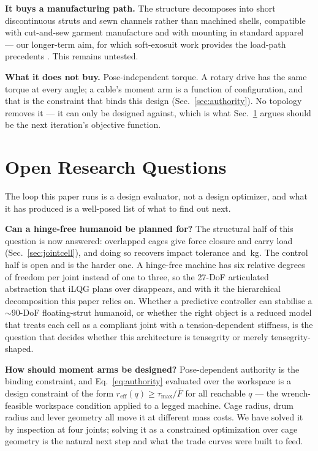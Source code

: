 \documentclass[conference]{IEEEtran}
\newcommand{\Fmax}{\bar{F}}
\begin{document}
\textbf{It buys a manufacturing path.} The structure decomposes into short
discontinuous struts and sewn channels rather than machined shells, compatible
with cut-and-sew garment manufacture and with mounting in standard apparel ---
our longer-term aim, for which soft-exosuit work provides the load-path
precedents \cite{quinlivan2017exosuit}. This remains untested.

\textbf{What it does not buy.} Pose-independent torque. A rotary drive has the
same torque at every angle; a cable's moment arm is a function of
configuration, and that is the constraint that binds this design
(Sec.~\ref{sec:authority}). No topology removes it --- it can only be designed
against, which is what Sec.~\ref{sec:questions} argues should be the next
iteration's objective function.

\section{Open Research Questions}
\label{sec:questions}
The loop this paper runs is a design evaluator, not a design optimizer, and
what it has produced is a well-posed list of what to find out next.

\textbf{Can a hinge-free humanoid be planned for?} The structural half of this
question is now answered: overlapped cages give force closure and carry load
(Sec.~\ref{sec:jointcell}), and doing so recovers impact tolerance and
\bearingMass\,kg. The control half is open and is the harder one. A hinge-free
machine has six relative degrees of freedom per joint instead of one to three,
so the 27-DoF articulated abstraction that iLQG plans over disappears, and
with it the hierarchical decomposition this paper relies on. Whether a
predictive controller can stabilise a $\sim$90-DoF floating-strut humanoid, or
whether the right object is a reduced model that treats each cell as a
compliant joint with a tension-dependent stiffness, is the question that
decides whether this architecture is tensegrity or merely tensegrity-shaped.

\textbf{How should moment arms be designed?} Pose-dependent authority is the
binding constraint, and Eq.~\eqref{eq:authority} evaluated over the workspace
is a design constraint of the form $r_{\mathrm{eff}}(q)\ge\tau_{\max}/\Fmax$
for all reachable $q$ --- the wrench-feasible workspace condition
\cite{gouttefarde2007wfw} applied to a legged machine. Cage radius, drum radius
and lever geometry all move it at different mass costs. We have solved it by
inspection at four joints; solving it as a constrained optimization over cage
geometry is the natural next step and what the trade curves were built to feed.
\end{document}
